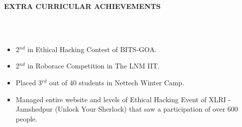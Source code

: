 \documentclass[a4paper,10pt]{article}
\newcommand{\lsep}{-0.5cm}
\newcommand{\resheading}[1]{{\small \colorbox{mygrey}{\begin{minipage}{0.975\textwidth}{\textbf{#1 \vphantom{p\^{E}}}}\end{minipage} \hspace{0.2cm}}}}
\begin{document}
\resheading{\textbf{EXTRA CURRICULAR ACHIEVEMENTS}}\\[\lsep]
\\
\begin{itemize}
 \item 2$^{nd}$ in Ethical Hacking Contest of BITS-GOA.
 \item 2$^{nd}$ in Roborace Competition in The LNM IIT.
 \item Placed 3$^{rd}$ out of 40 students in Nettech Winter Camp.
 \item Managed entire website and levels of Ethical Hacking Event of XLRI - Jamshedpur (Unlock Your Sherlock) that saw a participation of over 600 people.
\end{itemize}
\end{document}

